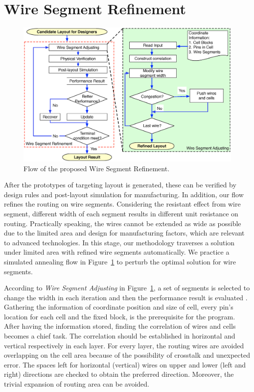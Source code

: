   \section{Wire Segment Refinement}\label{sec:WSR}

    \begin{figure}[t]
      \centering
      \includegraphics[width=\textwidth]{Fig/Chapter4/WireSegRefine.eps}
      \caption{Flow of the proposed Wire Segment Refinement.}
      \label{fig:WireSegRefine}
    \end{figure}
    
      


    After the prototypes of targeting layout is generated, these can be verified by design rules and post-layout simulation for manufacturing. In addition, our flow refines the routing on wire segments. Considering the resistant effect from wire segment, different width of each segment results in different unit resistance on routing. Practically speaking, the wires cannot be extended as wide as possible due to the limited area and design for manufacturing factors, which are relevant to advanced technologies. In this stage, our methodology traverses a solution under limited area with refined wire segments automatically. We practice a simulated annealing flow in Figure~\ref{fig:WireSegRefine} to perturb the optimal solution for wire segments.

    
    

    According to {\it Wire Segment Adjusting} in Figure~\ref{fig:WireSegRefine}, a set of segments is selected to change the width in each iteration and then the performance result is evaluated . Gathering the information of coordinate position and size of cell, every pin's location for each cell and the fixed block, is the prerequisite for the program. After having the information stored, finding the correlation of wires and cells becomes a chief task. The correlation should be established in horizontal and vertical respectively in each layer. For every layer, the routing wires are avoided overlapping on the cell area because of the possibility of crosstalk and unexpected error. The spaces left for horizontal (vertical) wires on upper and lower (left and right) directions are checked to obtain the preferred direction. Moreover, the trivial expansion of routing area can be avoided. 

